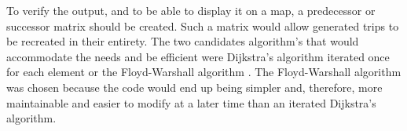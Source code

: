 

To verify the output, and to be able to display it on a map, a predecessor or successor matrix should be created. Such a matrix would allow generated trips to be recreated in their entirety. The two candidates algorithm's that would accommodate the needs and be efficient were Dijkstra's algorithm \citep{dijkstra1959note} iterated once for each element or the Floyd-Warshall algorithm \citep{floyd1962algorithm}. The Floyd-Warshall algorithm was chosen because the code would end up being simpler and, therefore, more maintainable and easier to modify at a later time than an iterated Dijkstra's algorithm.

